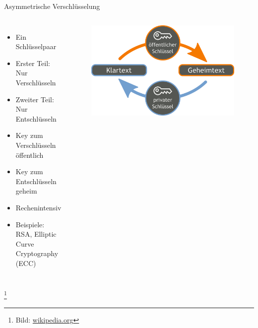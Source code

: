 \documentclass[10pt]{beamer}
\newcommand\blfootnote[1]{%
	\begingroup
	\renewcommand\thefootnote{}\footnote{#1}%
	\addtocounter{footnote}{-1}%
	\endgroup
}
\begin{document}
\begin{frame}[fragile]{Asymmetrische Verschlüsselung}
\begin{columns}[T,c,onlytextwidth]
	\begin{itemize}
		\item Ein Schlüsselpaar
		\item Erster Teil: Nur Verschlüsseln
		\item Zweiter Teil: Nur Entschlüsseln
		\item Key zum Verschlüsseln öffentlich
		\item Key zum Entschlüsseln geheim
		\item Rechenintensiv
		\item Beispiele: RSA, Elliptic Curve Cryptography (ECC)
	\end{itemize}
	\begin{figure}
		\includegraphics[width=1\textwidth]{images/asym}
	\end{figure}
\end{columns}
\blfootnote{Bild: \href{https://de.wikipedia.org/wiki/Asymmetrisches_Kryptosystem}{wikipedia.org}}
\end{frame}
\end{document}
